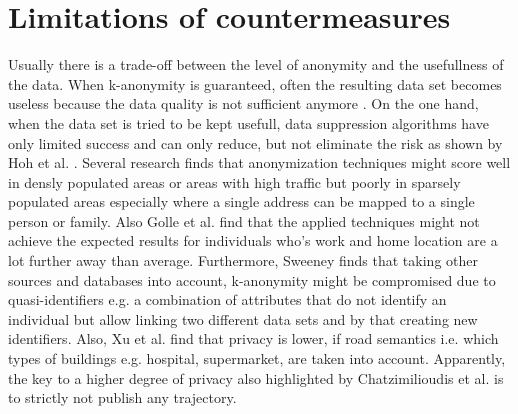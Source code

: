 \section{Limitations of countermeasures}
Usually there is a trade-off between the level of anonymity and the usefullness of the data. When k-anonymity is guaranteed, often the resulting data set becomes useless because the data quality is not sufficient anymore \parencite{krumm, cellphone, k-anonymity-old, k-anonymity, k-anonymity-achieving}.
On the one hand, when the data set is tried to be kept usefull, data suppression algorithms have only limited success and can only reduce, but not eliminate the risk as shown by Hoh et al. \parencite{hoh2006enhancing}. Several research \parencite{time-to-confusion, location-privacy, hoh2006enhancing} finds that anonymization techniques might score well in densly populated areas or areas with high traffic but poorly in sparsely populated areas especially where a single address can be mapped to a single person or family. Also Golle et al. \parencite{privacy-home-work-pairs} find that the applied techniques might not achieve the expected results for individuals who's work and home location are a lot further away than average.
Furthermore, Sweeney \parencite{k-anonymity-achieving} finds that taking other sources and databases into account, k-anonymity might be compromised due to quasi-identifiers e.g. a combination of attributes that do not identify an individual but allow linking two different data sets and by that creating new identifiers. Also, Xu et al. \parencite{xu2018location} find that privacy is lower, if road semantics i.e. which types of buildings e.g. hospital, supermarket, are taken into account.
Apparently, the key to a higher degree of privacy also highlighted by Chatzimilioudis et al. \parencite{chatzimilioudis2012crowdsourcing} is to strictly not publish any trajectory.


